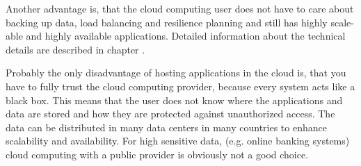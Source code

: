 Another advantage is, that the cloud computing user does not have to care about backing up data, load balancing and resilience planning and still has highly scale-able and highly available applications. Detailed information about the technical details are described in chapter \label{chap:implementation}. 

Probably the only disadvantage of hosting applications in the cloud  is, that you have to fully trust the cloud computing provider, because every system acts like a black box. This means that the user does not know where the applications and data are stored and how they are protected against unauthorized access. The data can be distributed in many data centers in many countries to enhance scalability and availability. For high sensitive data, (e.g. online banking systems) cloud computing with a public provider is obviously not a good choice.